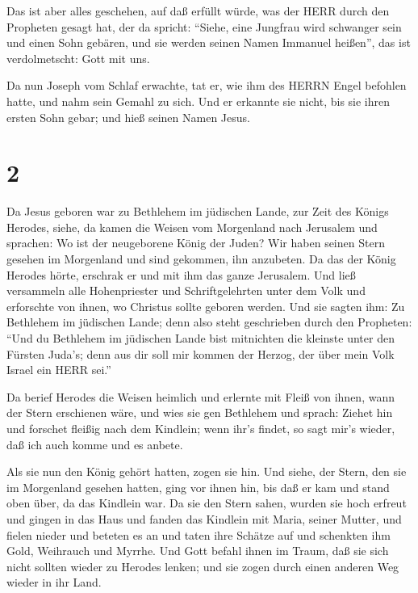  Das ist aber alles geschehen, auf daß erfüllt würde, was
der HERR durch den Propheten gesagt hat, der da spricht: 
``Siehe, eine Jungfrau wird schwanger sein und einen Sohn gebären, und
sie werden seinen Namen Immanuel heißen'', das ist verdolmetscht: Gott
mit uns.

 Da nun Joseph vom Schlaf erwachte, tat er, wie ihm des
HERRN Engel befohlen hatte, und nahm sein Gemahl zu sich. 
Und er erkannte sie nicht, bis sie ihren ersten Sohn gebar; und hieß
seinen Namen Jesus.

\hypertarget{section-1}{%
\section{2}\label{section-1}}

 Da Jesus geboren war zu Bethlehem im jüdischen Lande, zur
Zeit des Königs Herodes, siehe, da kamen die Weisen vom Morgenland nach
Jerusalem und sprachen:  Wo ist der neugeborene König der
Juden? Wir haben seinen Stern gesehen im Morgenland und sind gekommen,
ihn anzubeten.  Da das der König Herodes hörte, erschrak er
und mit ihm das ganze Jerusalem.  Und ließ versammeln alle
Hohenpriester und Schriftgelehrten unter dem Volk und erforschte von
ihnen, wo Christus sollte geboren werden.  Und sie sagten
ihm: Zu Bethlehem im jüdischen Lande; denn also steht geschrieben durch
den Propheten:  ``Und du Bethlehem im jüdischen Lande bist
mitnichten die kleinste unter den Fürsten Juda's; denn aus dir soll mir
kommen der Herzog, der über mein Volk Israel ein HERR sei.''

 Da berief Herodes die Weisen heimlich und erlernte mit
Fleiß von ihnen, wann der Stern erschienen wäre,  und wies
sie gen Bethlehem und sprach: Ziehet hin und forschet fleißig nach dem
Kindlein; wenn ihr's findet, so sagt mir's wieder, daß ich auch komme
und es anbete.

 Als sie nun den König gehört hatten, zogen sie hin. Und
siehe, der Stern, den sie im Morgenland gesehen hatten, ging vor ihnen
hin, bis daß er kam und stand oben über, da das Kindlein war.
 Da sie den Stern sahen, wurden sie hoch erfreut
 und gingen in das Haus und fanden das Kindlein mit Maria,
seiner Mutter, und fielen nieder und beteten es an und taten ihre
Schätze auf und schenkten ihm Gold, Weihrauch und Myrrhe. 
Und Gott befahl ihnen im Traum, daß sie sich nicht sollten wieder zu
Herodes lenken; und sie zogen durch einen anderen Weg wieder in ihr
Land.


